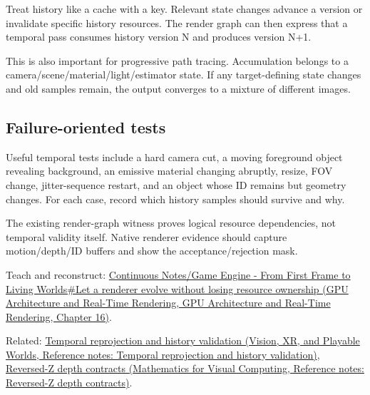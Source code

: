 Treat history like a cache with a key. Relevant state changes advance a version or invalidate specific history resources. The render graph can then express that a temporal pass consumes history version N and produces version N+1.

This is also important for progressive path tracing. Accumulation belongs to a camera/scene/material/light/estimator state. If any target-defining state changes and old samples remain, the output converges to a mixture of different images.

\subsection{Failure-oriented tests}\label{appendix-2e7e9fd28a2c-failure-oriented-tests}

Useful temporal tests include a hard camera cut, a moving foreground object revealing background, an emissive material changing abruptly, resize, FOV change, jitter-sequence restart, and an object whose ID remains but geometry changes. For each case, record which history samples should survive and why.

The existing render-graph witness proves logical resource dependencies, not temporal validity itself. Native renderer evidence should capture motion/depth/ID buffers and show the acceptance/rejection mask.

Teach and reconstruct: \href{../06-GPU-Architecture-and-Real-Time-Rendering/main.pdf\#nameddest=06-engine-ii-ch025-let-a-renderer-evolve-without-losing-resource-ownership}{Continuous Notes/Game Engine - From First Frame to Living Worlds\#Let a renderer evolve without losing resource ownership (GPU Architecture and Real-Time Rendering, GPU Architecture and Real-Time Rendering, Chapter 16)}.

Related: \href{../07-Vision-XR-and-Playable-Worlds/main.pdf\#nameddest=appendix-0727340a4428}{Temporal reprojection and history validation (Vision, XR, and Playable Worlds, Reference notes: Temporal reprojection and history validation)}, \href{../02-Mathematics-for-Visual-Computing/main.pdf\#nameddest=appendix-275ec8847057}{Reversed-Z depth contracts (Mathematics for Visual Computing, Reference notes: Reversed-Z depth contracts)}.
